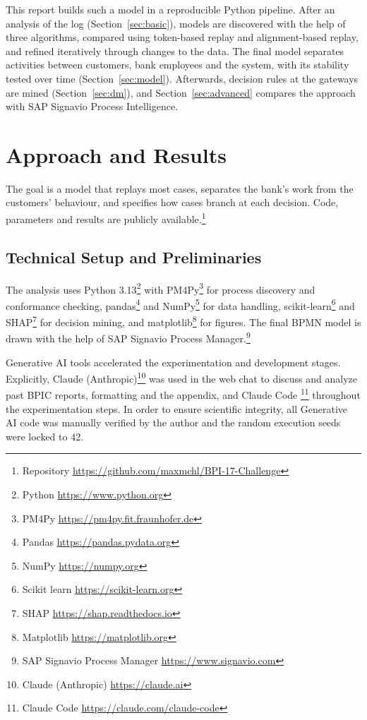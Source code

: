 \documentclass[
  english,        %
  font=times,     %
  twocolumn,      %
]{tumarticle}
\begin{document}
This report builds such a model in a reproducible Python pipeline. After an analysis of the log (Section~\ref{sec:basic}), models are discovered with the help of three algorithms, compared using token-based replay and alignment-based replay, and refined iteratively through changes to the data. The final model separates activities between customers, bank employees and the system, with its stability tested over time (Section~\ref{sec:model}). Afterwards, decision rules at the gateways are mined (Section~\ref{sec:dm}), and Section~\ref{sec:advanced} compares the approach with SAP Signavio Process Intelligence. 


\section{Approach and Results}

The goal is a model that replays most cases, separates the bank's work from
the customers' behaviour, and specifies how cases branch at each decision. Code, parameters and results are publicly available.\footnote{Repository \url{https://github.com/maxmchl/BPI-17-Challenge}}

\subsection{Technical Setup and Preliminaries}
The analysis uses Python 3.13\footnote{Python \url{https://www.python.org}} with PM4Py\footnote{PM4Py \url{https://pm4py.fit.fraunhofer.de}} for process discovery and conformance checking, pandas\footnote{Pandas \url{https://pandas.pydata.org}} and NumPy\footnote{NumPy \url{https://numpy.org}} for data handling, scikit-learn\footnote{Scikit learn \url{https://scikit-learn.org}} and SHAP\footnote{SHAP \url{https://shap.readthedocs.io}} for decision mining, and matplotlib\footnote{Matplotlib \url{https://matplotlib.org}} for figures. The final BPMN model is drawn with the help of SAP Signavio Process Manager.\footnote{SAP Signavio Process Manager \url{https://www.signavio.com}}

Generative AI tools accelerated the experimentation and development stages. Explicitly, Claude (Anthropic)\footnote{Claude (Anthropic) \url{https://claude.ai}} was used in the web chat to discuss and analyze past BPIC reports, formatting and the appendix, and Claude Code \footnote{Claude Code \url{https://claude.com/claude-code}} throughout the experimentation steps. In order to ensure scientific integrity, all Generative AI code was manually verified by the author and the random execution seeds were locked to 42. 
\end{document}
